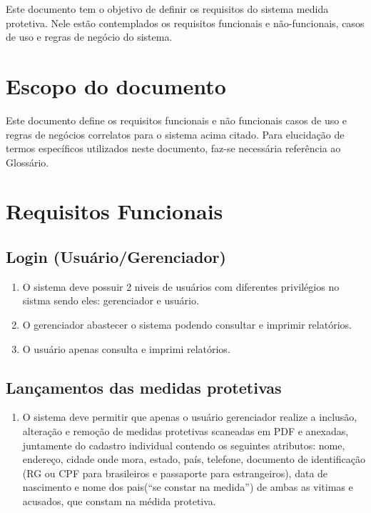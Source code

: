 \documentclass[
	12pt,				%
    oneside,			%
	a4paper,			%
	english,			%
	french,				%
	spanish,			%
	brazil,				%
	]{abntex2}
\begin{document}
Este documento tem o objetivo de definir os requisitos do sistema medida protetiva. Nele estão contemplados os requisitos funcionais e não-funcionais, casos de uso e regras de negócio do sistema.

\section{Escopo do documento}

Este documento define os requisitos funcionais e não funcionais casos de uso e regras de negócios correlatos para o sistema acima citado. Para elucidação de termos específicos utilizados neste documento, faz-se necessária referência ao Glossário.

\section {Requisitos Funcionais}\label{RF}

\subsection{Login (Usuário/Gerenciador)}\label{RF1}
\begin{enumerate}
	\item O sistema deve possuir 2 niveis de usuários com diferentes privilégios no sistma sendo eles: gerenciador e usuário.\label{login1}
	\item O gerenciador abastecer o sistema podendo consultar e imprimir relatórios.
	\item O usuário apenas consulta e imprimi relatórios.
	
\end{enumerate}

\subsection{Lançamentos das medidas protetivas}\label{RF2} 
\begin{enumerate} 
	\item O sistema deve permitir que apenas o usuário gerenciador realize a inclusão, alteração e remoção de medidas protetivas scaneadas em PDF e anexadas, juntamente do cadastro individual contendo os seguintes atributos: nome, endereço, cidade onde mora, estado, país, telefone, documento de identificação (RG ou CPF para brasileiros e passaporte para estrangeiros), data de nascimento e nome dos pais(“se constar na medida”) de ambas as vitimas e acusados, que constam na médida protetiva.\label{teste}
	
\end{enumerate}
\end{document}
